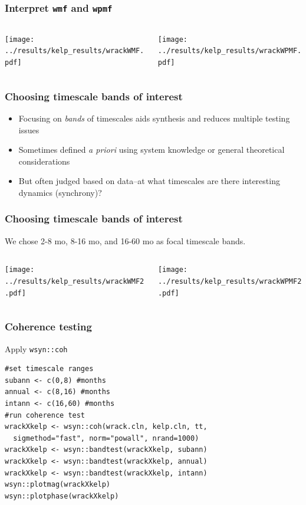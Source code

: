 \documentclass{beamer}
\begin{document}
\begin{frame}[fragile]
\frametitle{Interpret \texttt{wmf} and \texttt{wpmf}}
\begin{columns}[c]
\begin{column}{6cm}
\texttt{[image: ../results/kelp\_results/wrackWMF.pdf]}
\end{column}
\begin{column}{6cm}
\texttt{[image: ../results/kelp\_results/wrackWPMF.pdf]}
\end{column}
\end{columns}
\end{frame}

\begin{frame}
\frametitle{Choosing timescale bands of interest}
\begin{itemize}
\item Focusing on \textit{bands} of timescales aids synthesis and reduces multiple testing issues
\item Sometimes defined \textit{a priori} using system knowledge or general theoretical considerations
\item But often judged based on data--at what timescales are there interesting dynamics (synchrony)?
\end{itemize}
\end{frame}

\begin{frame}[fragile]
\frametitle{Choosing timescale bands of interest}
We chose 2-8 mo, 8-16 mo, and 16-60 mo as focal timescale bands.
\begin{columns}[c]
\begin{column}{6cm}
\texttt{[image: ../results/kelp\_results/wrackWMF2.pdf]}
\end{column}
\begin{column}{6cm}
\texttt{[image: ../results/kelp\_results/wrackWPMF2.pdf]}
\end{column}
\end{columns}
\end{frame}

\begin{frame}[fragile]
\frametitle{Coherence testing}
\begin{exampleblock}{Apply \texttt{wsyn::coh}}
\begin{verbatim}
#set timescale ranges
subann <- c(0,8) #months
annual <- c(8,16) #months
intann <- c(16,60) #months
#run coherence test
wrackXkelp <- wsyn::coh(wrack.cln, kelp.cln, tt, 
  sigmethod="fast", norm="powall", nrand=1000)
wrackXkelp <- wsyn::bandtest(wrackXkelp, subann)
wrackXkelp <- wsyn::bandtest(wrackXkelp, annual)
wrackXkelp <- wsyn::bandtest(wrackXkelp, intann)
wsyn::plotmag(wrackXkelp) 
wsyn::plotphase(wrackXkelp)
\end{verbatim}
\end{exampleblock}
\end{frame}
\end{document}
